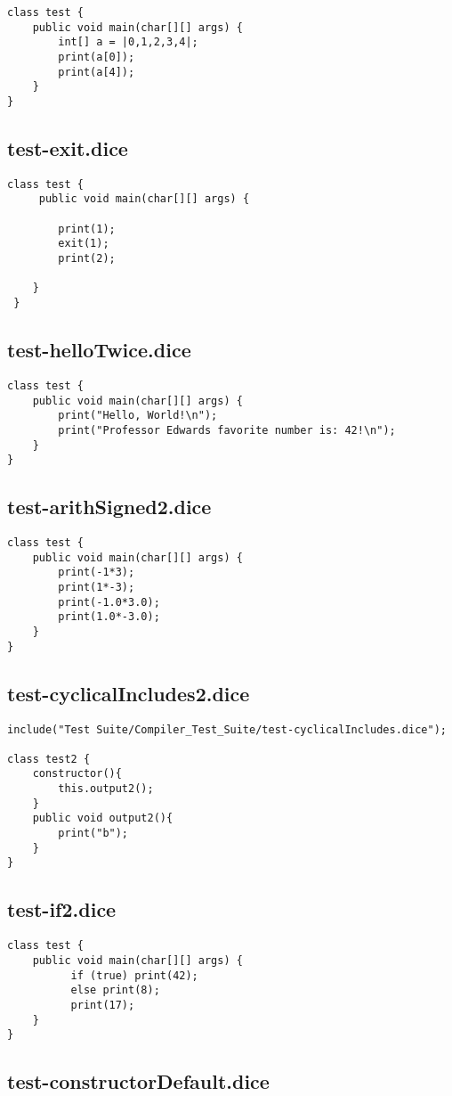 \begin{verbatim}
class test {
	public void main(char[][] args) {
		int[] a = |0,1,2,3,4|;
		print(a[0]);
		print(a[4]);
	}
}

\end{verbatim}\pagebreak\subsection{test-exit.dice}
\begin{verbatim}
class test {
	 public void main(char[][] args) {
		
		print(1);
		exit(1);
		print(2);

 	}
 }
\end{verbatim}\pagebreak\subsection{test-helloTwice.dice}
\begin{verbatim}
class test {
	public void main(char[][] args) {
		print("Hello, World!\n");
		print("Professor Edwards favorite number is: 42!\n");
	}
}
\end{verbatim}\pagebreak\subsection{test-arithSigned2.dice}
\begin{verbatim}
class test {
	public void main(char[][] args) {
		print(-1*3);
		print(1*-3);
		print(-1.0*3.0);
		print(1.0*-3.0);
	}
}
\end{verbatim}\pagebreak\subsection{test-cyclicalIncludes2.dice}
\begin{verbatim}
include("Test Suite/Compiler_Test_Suite/test-cyclicalIncludes.dice");

class test2 {
	constructor(){
		this.output2();
	}
	public void output2(){
		print("b");
	}
}

\end{verbatim}\pagebreak\subsection{test-if2.dice}
\begin{verbatim}
class test {
	public void main(char[][] args) {
		  if (true) print(42); 
		  else print(8);
  		  print(17);
  	}
}

\end{verbatim}\pagebreak\subsection{test-constructorDefault.dice}
